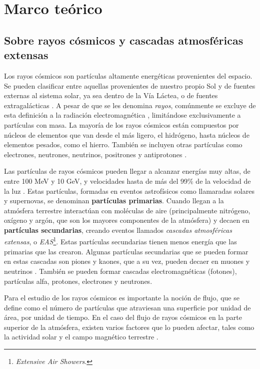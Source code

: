 \documentclass[12pt]{report}
\begin{document}
\section*{Marco teórico}

\subsection*{Sobre rayos cósmicos y cascadas atmosféricas extensas}

\normalsize

Los rayos cósmicos son partículas  altamente energéticas provenientes del espacio. Se pueden clasificar entre aquellas provenientes de nuestro propio Sol y de fuentes externas al sistema solar, ya sea dentro de la Vía Láctea, o de fuentes extragalácticas \cite{moldwin2008introduction}. A pesar de que se les denomina \textit{rayos}, comúnmente se excluye de esta definición a la radiación electromagnética \cite{NASACosmicopia}, limitándose exclusivamente a partículas con masa. La mayoría de los rayos cósmicos están compuestos por núcleos de elementos que van desde el más ligero, el hidrógeno, hasta núcleos de elementos pesados, como el hierro. También se incluyen otras partículas como electrones, neutrones, neutrinos, positrones y antiprotones \cite{NASAImagine}.

Las partículas de rayos cósmicos pueden llegar a alcanzar energías muy altas, de entre 100 MeV y 10 GeV, y velocidades hasta de más del 99\% de la velocidad de la luz \cite{moldwin2008introduction}. Estas partículas, formadas en eventos astrofísicos como llamaradas solares y supernovas, se denominan \textbf{partículas primarias}. Cuando llegan a la atmósfera terrestre interactúan con moléculas de aire (principalmente nitrógeno, oxígeno y argón, que son los mayores componentes de la atmósfera) y decaen en \textbf{partículas secundarias}, creando eventos llamados \textit{cascadas atmosféricas extensas}, o \textit{EAS}\footnote{\textit{Extensive Air Showers}.}. Estas partículas secundarias tienen menos energía que las primarias que las crearon. Algunas partículas secundarias que se pueden formar en estas cascadas son piones y kaones, que a su vez, pueden decaer en muones y neutrinos \cite{grieder2010extensive}. También se pueden formar cascadas electromagnéticas (fotones), partículas alfa, protones, electrones y neutrones.

Para el estudio de los rayos cósmicos es importante la noción de flujo, que se define como el número de partículas que atraviesan una superficie por unidad de área, por unidad de tiempo. En el caso del flujo de rayos cósmicos en la parte superior de la atmósfera, existen varios factores que lo pueden afectar, tales como la actividad solar y el campo magnético terrestre \cite{PhysRevD.98.030001}.
\end{document}
